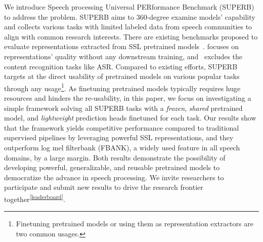 \documentclass[a4paper]{article}
\begin{document}
We introduce Speech processing Universal PERformance Benchmark (SUPERB) to address the problem.
SUPERB aims to 360-degree examine models' capability and collects various tasks with limited labeled data from speech communities to align with common research interests.
There are existing benchmarks proposed to evaluate representations extracted from SSL pretrained models~\cite{zerospeech,non-semantic}.
\cite{zerospeech} focuses on representations' quality without any downstream training, and~\cite{non-semantic} excludes the content recognition tasks like ASR.
Compared to existing efforts, SUPERB targets at the direct usability of pretrained models on various popular tasks through any usage\footnote{\label{multi-approaches}Finetuning pretrained models or using them as representation extractors are two common usages.}.
As finetuning pretrained models typically requires huge resources and hinders the re-usability, in this paper, we focus on investigating a simple framework solving all SUPERB tasks with a \textit{frozen}, \textit{shared} pretrained model, and \textit{lightweight} prediction heads finetuned for each task.
Our results show that the framework yields competitive performance compared to traditional supervised pipelines by leveraging powerful SSL representations, and they outperform log mel filterbank (FBANK), a widely used feature in all speech domains, by a large margin.
Both results demonstrate the possibility of developing powerful, generalizable, and reusable pretrained models to democratize the advance in speech processing.
We invite researchers to participate and submit new results to drive the research frontier together\textsuperscript{\ref{leaderboard}}.


\end{document}
